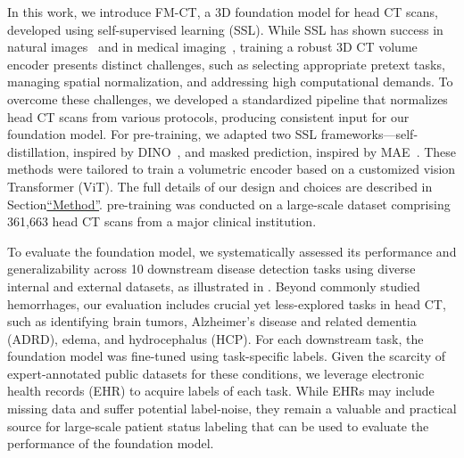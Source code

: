 \documentclass[fleqn,10pt]{wlscirep}
\begin{document}
In this work, we introduce FM-CT, a 3D foundation model for head CT scans, developed using self-supervised learning (SSL). While SSL has shown success in natural images~\cite{chen2020simple, he2020momentum, caron2020unsupervised, caron2021emerging, bao2022beit, He2021MaskedAA, zhou2021ibot, oquab2023dinov2, zbontar2021barlow, bardes2022vicreg} and in medical imaging~\cite{Liu_2023_CVPR, zhu2022interpretablepredictionlungsquamous, chen_towards_2024, zhou2023foundation, Huang2023, azizi21big, Vorontsov2024, huang2023radiology, huang21GLoRIA, chen23masked, Azizi2023}, training a robust 3D CT volume encoder presents distinct challenges, such as selecting appropriate pretext tasks, managing spatial normalization, and addressing high computational demands. To overcome these challenges, we developed a standardized pipeline that normalizes head CT scans from various protocols, producing consistent input for our foundation model. For pre-training, we adapted two SSL frameworks—self-distillation, inspired by DINO~\cite{caron2021emerging}, and masked prediction, inspired by MAE~\cite{He2021MaskedAA}. These methods were tailored to train a volumetric encoder based on a customized vision Transformer (ViT)\cite{dosovitskiy2020vit}. The full details of our design and choices are described in Section\hyperref[sec:methods]{``Method''}. pre-training was conducted on a large-scale dataset comprising 361,663 head CT scans from a major clinical institution.

To evaluate the foundation model, we systematically assessed its performance and generalizability across 10 downstream disease detection tasks using diverse internal and external datasets, as illustrated in . Beyond commonly studied hemorrhages, our evaluation includes crucial yet less-explored tasks in head CT, such as identifying brain tumors, Alzheimer’s disease and related dementia (ADRD), edema, and hydrocephalus (HCP). For each downstream task, the foundation model was fine-tuned using task-specific labels. Given the scarcity of expert-annotated public datasets for these conditions, we leverage electronic health records (EHR) to acquire labels of each task. While EHRs may include missing data and suffer potential label-noise, they remain a valuable and practical source for large-scale patient status labeling that can be used to evaluate the performance of the foundation model.
\end{document}
